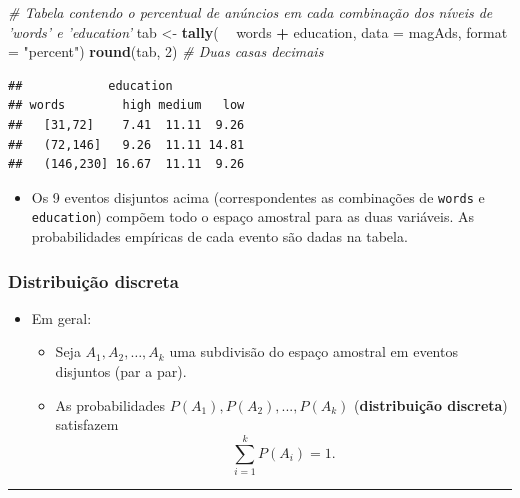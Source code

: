 \documentclass[]{article}
\newenvironment{Shaded}{\begin{snugshade}}{\end{snugshade}}
\newcommand{\KeywordTok}[1]{\textcolor[rgb]{0.13,0.29,0.53}{\textbf{#1}}}
\newcommand{\DataTypeTok}[1]{\textcolor[rgb]{0.13,0.29,0.53}{#1}}
\newcommand{\DecValTok}[1]{\textcolor[rgb]{0.00,0.00,0.81}{#1}}
\newcommand{\StringTok}[1]{\textcolor[rgb]{0.31,0.60,0.02}{#1}}
\newcommand{\CommentTok}[1]{\textcolor[rgb]{0.56,0.35,0.01}{\textit{#1}}}
\newcommand{\OperatorTok}[1]{\textcolor[rgb]{0.81,0.36,0.00}{\textbf{#1}}}
\newcommand{\NormalTok}[1]{#1}
\providecommand{\tightlist}{%
  \setlength{\itemsep}{0pt}\setlength{\parskip}{0pt}}
\begin{document}
\begin{Shaded}
\begin{Highlighting}[]
\CommentTok{# Tabela contendo o percentual de anúncios em cada combinação dos níveis de 'words' e 'education'}
\NormalTok{tab <-}\StringTok{ }\KeywordTok{tally}\NormalTok{( }\OperatorTok{~}\StringTok{ }\NormalTok{words }\OperatorTok{+}\StringTok{ }\NormalTok{education, }\DataTypeTok{data =}\NormalTok{ magAds, }\DataTypeTok{format =} \StringTok{"percent"}\NormalTok{)}
\KeywordTok{round}\NormalTok{(tab, }\DecValTok{2}\NormalTok{) }\CommentTok{# Duas casas decimais}
\end{Highlighting}
\end{Shaded}

\begin{verbatim}
##            education
## words        high medium   low
##   [31,72]    7.41  11.11  9.26
##   (72,146]   9.26  11.11 14.81
##   (146,230] 16.67  11.11  9.26
\end{verbatim}

\begin{itemize}
\tightlist
\item
  Os 9 eventos disjuntos acima (correspondentes as combinações de
  \texttt{words} e \texttt{education}) compõem todo o espaço amostral
  para as duas variáveis. As probabilidades empíricas de cada evento são
  dadas na tabela.
\end{itemize}

\subsubsection{Distribuição discreta}\label{distribuicao-discreta-1}

\begin{itemize}
\tightlist
\item
  Em geral:

  \begin{itemize}
  \tightlist
  \item
    Seja \(A_1,A_2,\ldots,A_k\) uma subdivisão do espaço amostral em
    eventos disjuntos (par a par).
  \item
    As probabilidades \(P(A_1), P(A_2), ..., P(A_k)\)
    (\textbf{distribuição discreta}) satisfazem
    \[\sum_{i=1}^kP(A_i)=1.\]
  \end{itemize}
\end{itemize}

\begin{center}\rule{0.5\linewidth}{\linethickness}\end{center}
\end{document}
